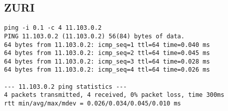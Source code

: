\subsection{ZURI}
\begin{lstlisting}
ping -i 0.1 -c 4 11.103.0.2
PING 11.103.0.2 (11.103.0.2) 56(84) bytes of data.
64 bytes from 11.103.0.2: icmp_seq=1 ttl=64 time=0.040 ms
64 bytes from 11.103.0.2: icmp_seq=2 ttl=64 time=0.045 ms
64 bytes from 11.103.0.2: icmp_seq=3 ttl=64 time=0.028 ms
64 bytes from 11.103.0.2: icmp_seq=4 ttl=64 time=0.026 ms

--- 11.103.0.2 ping statistics ---
4 packets transmitted, 4 received, 0% packet loss, time 300ms
rtt min/avg/max/mdev = 0.026/0.034/0.045/0.010 ms
\end{lstlisting}

